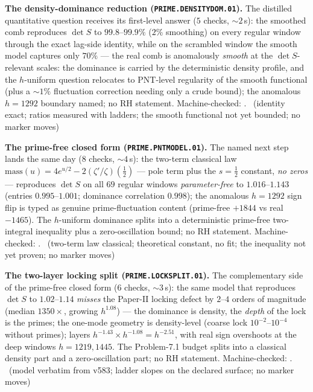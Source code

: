 \par\smallskip\noindent\textbf{The density-dominance reduction
(\texttt{PRIME.DENSITYDOM.01}).}
The distilled quantitative question receives its first-level answer
($5$ checks, ${\sim}2$\,s): the smoothed comb reproduces $\det S$ to
$99.8$--$99.9\%$ ($2\%$ smoothing) on every regular window through the
exact lag-side identity, while on the scrambled window the smooth model
captures only $70\%$ --- the real comb is anomalously \emph{smooth} at
the $\det S$-relevant scales: the dominance is carried by the
deterministic density profile, and the $h$-uniform question relocates to
PNT-level regularity of the smooth functional (plus a ${\sim}1\%$
fluctuation correction needing only a crude bound); the anomalous
$h=1292$ boundary named; no RH statement. Machine-checked:
.
\mE\ (identity exact; ratios measured with ladders; the smooth
functional not yet bounded; no marker moves)
\par\smallskip


\par\smallskip\noindent\textbf{The prime-free closed form
(\texttt{PRIME.PNTMODEL.01}).}
The named next step lands the same day ($8$ checks, ${\sim}4$\,s): the
two-term classical law
$\mathrm{mass}(u)=4e^{u/2}-2(\zeta'/\zeta)(\tfrac12)$ --- pole term
plus the $s=\tfrac12$ constant, \emph{no zeros} --- reproduces
$\det S$ on all $69$ regular windows \emph{parameter-free} to
$1.016$--$1.143$ (entries $0.995$--$1.001$; dominance correlation
$0.998$); the anomalous $h=1292$ sign flip is typed as genuine
prime-fluctuation content (prime-free $+1844$ vs real $-1465$). The
$h$-uniform dominance splits into a deterministic prime-free
two-integral inequality plus a zero-oscillation bound; no RH statement.
Machine-checked: .
\mE\ (two-term law classical; theoretical constant, no fit; the
inequality not yet proven; no marker moves)
\par\smallskip


\par\smallskip\noindent\textbf{The two-layer locking split
(\texttt{PRIME.LOCKSPLIT.01}).}
The complementary side of the prime-free closed form ($6$ checks,
${\sim}3$\,s): the same model that reproduces $\det S$ to
$1.02$--$1.14$ \emph{misses} the Paper-II locking defect by $2$--$4$
orders of magnitude (median $1350\times$, growing $h^{1.08}$) --- the
dominance is density, the \emph{depth} of the lock is the primes; the
one-mode geometry is density-level (coarse lock $10^{-2}$--$10^{-4}$
without primes); layers $h^{-1.43}\times h^{-1.08}=h^{-2.51}$, with
real sign overshoots at the deep windows $h=1219,1445$.  The
Problem-7.1 budget splits into a classical density part and a
zero-oscillation part; no RH statement. Machine-checked:
.
\mE\ (model verbatim from v583; ladder slopes on the declared
surface; no marker moves)
\par\smallskip


